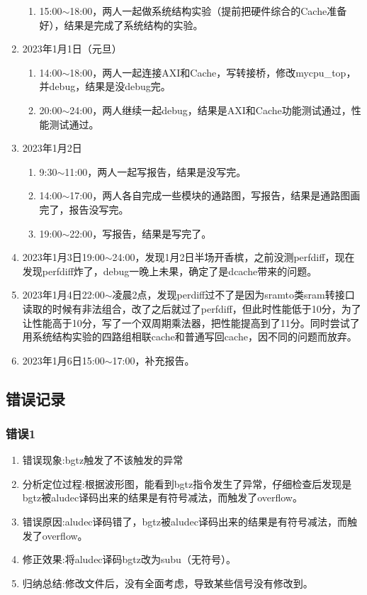 \begin{enumerate}
\begin{enumerate}[(1)]
        \item 15:00$\sim$18:00，两人一起做系统结构实验（提前把硬件综合的Cache准备好），结果是完成了系统结构的实验。
    \end{enumerate}
    \item 2023年1月1日（元旦）
    \begin{enumerate}[(1)]
        \item 14:00$\sim$18:00，两人一起连接AXI和Cache，写转接桥，修改mycpu\_top，并debug，结果是没debug完。
        \item 20:00$\sim$24:00，两人继续一起debug，结果是AXI和Cache功能测试通过，性能测试通过。
    \end{enumerate}
    \item 2023年1月2日
    \begin{enumerate}[(1)]
        \item 9:30$\sim$11:00，两人一起写报告，结果是没写完。
        \item 14:00$\sim$17:00，两人各自完成一些模块的通路图，写报告，结果是通路图画完了，报告没写完。
        \item 19:00$\sim$22:00，写报告，结果是写完了。
    \end{enumerate}
    \item 2023年1月3日19:00$\sim$24:00，发现1月2日半场开香槟，之前没测perfdiff，现在发现perfdiff炸了，debug一晚上未果，确定了是dcache带来的问题。
    \item 2023年1月4日22:00$\sim$凌晨2点，发现perdiff过不了是因为sramto类sram转接口读取的时候有非法组合，改了之后就过了perfdiff，但此时性能低于10分，为了让性能高于10分，写了一个双周期乘法器，把性能提高到了11分。同时尝试了用系统结构实验的四路组相联cache和普通写回cache，因不同的问题而放弃。
    \item 2023年1月6日15:00$\sim$17:00，补充报告。
\end{enumerate}

\subsection{错误记录}



\subsubsection{错误1}
\begin{enumerate}[(1)]
    \item 错误现象:bgtz触发了不该触发的异常
    \item 分析定位过程:根据波形图，能看到bgtz指令发生了异常，仔细检查后发现是bgtz被aludec译码出来的结果是有符号减法，而触发了overflow。
    \item 错误原因:aludec译码错了，bgtz被aludec译码出来的结果是有符号减法，而触发了overflow。
    \item 修正效果:将aludec译码bgtz改为subu（无符号）。
    \item 归纳总结:修改文件后，没有全面考虑，导致某些信号没有修改到。
\end{enumerate}

